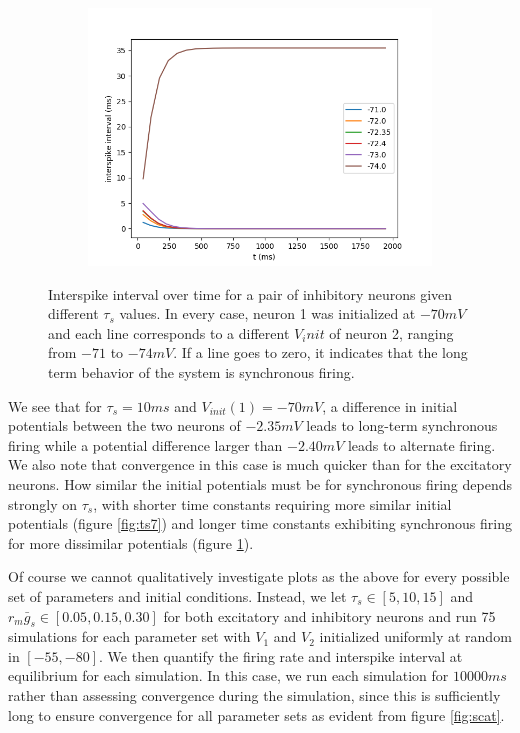 \documentclass{article}
\begin{document}
\begin{figure}[h]
	\begin{subfigure}[t]{0.30\linewidth}
		\centering
		\includegraphics[width = 1.0\linewidth, trim={20 10 20 20}, clip=true]{intervals_ts_13i.png}
		\label{fig:ts13}	
	\end{subfigure}%
\label{fig:intsi}
\caption{Interspike interval over time for a pair of inhibitory neurons given different $\tau_s$ values. In every case, neuron 1 was initialized at $-70 mV$ and each line corresponds to a different $V_init$ of neuron 2, ranging from $-71$ to $-74 mV$. If a line goes to zero, it indicates that the long term behavior of the system is synchronous firing.}
\end{figure}

We see that for $\tau_s=10ms$ and $V_{init}(1)=-70 mV$, a difference in initial potentials between the two neurons of $-2.35 mV$ leads to long-term synchronous firing while a potential difference larger than $-2.40mV$ leads to alternate firing. We also note that convergence in this case is much quicker than for the excitatory neurons.
How similar the initial potentials must be for synchronous firing depends strongly on $\tau_s$, with shorter time constants requiring more similar initial potentials (figure \ref{fig:ts7}) and longer time constants exhibiting synchronous firing for more dissimilar potentials (figure \ref{fig:ts13}).

Of course we cannot qualitatively investigate plots as the above for every possible set of parameters and initial conditions. Instead, we let $\tau_s \in [5, 10, 15]$ and $r_m \bar g_s \in [0.05, 0.15, 0.30]$ for both excitatory and inhibitory neurons and run 75 simulations for each parameter set with $V_1$ and $V_2$ initialized uniformly at random in $[-55, -80]$.
We then quantify the firing rate and interspike interval at equilibrium for each simulation.
In this case, we run each simulation for $10000 ms$ rather than assessing convergence during the simulation, since this is sufficiently long to ensure convergence for all parameter sets as evident from figure \ref{fig:scat}.
\end{document}
